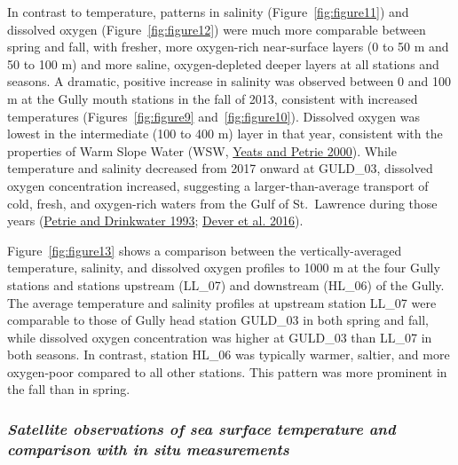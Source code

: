 \documentclass[12pt]{article}\usepackage[]{graphicx}\usepackage[]{color}
\begin{document}
In contrast to temperature, patterns in salinity (Figure~\ref{fig:figure11}) and dissolved oxygen (Figure~\ref{fig:figure12}) were much more comparable between spring and fall, with fresher, more oxygen-rich near-surface layers (0 to 50 m and 50 to 100 m) and more saline, oxygen-depleted deeper layers at all stations and seasons. A dramatic, positive increase in salinity was observed between 0 and 100 m at the Gully mouth stations in the fall of 2013, consistent with increased temperatures (Figures~\ref{fig:figure9} and~\ref{fig:figure10}). Dissolved oxygen was lowest in the intermediate (100 to 400 m) layer in that year, consistent with the properties of Warm Slope Water (WSW, \protect\hyperlink{ref-yeats_2000}{Yeats and Petrie 2000}). While temperature and salinity decreased from 2017 onward at GULD\_03, dissolved oxygen concentration increased, suggesting a larger-than-average transport of cold, fresh, and oxygen-rich waters from the Gulf of St.~Lawrence during those years (\protect\hyperlink{ref-petrie_1993}{Petrie and Drinkwater 1993}; \protect\hyperlink{ref-dever_2016}{Dever et al. 2016}).

Figure~\ref{fig:figure13} shows a comparison between the vertically-averaged temperature, salinity, and dissolved oxygen profiles to 1000 m at the four Gully stations and stations upstream (LL\_07) and downstream (HL\_06) of the Gully. The average temperature and salinity profiles at upstream station LL\_07 were comparable to those of Gully head station GULD\_03 in both spring and fall, while dissolved oxygen concentration was higher at GULD\_03 than LL\_07 in both seasons. In contrast, station HL\_06 was typically warmer, saltier, and more oxygen-poor compared to all other stations. This pattern was more prominent in the fall than in spring.

\hypertarget{satellite-observations-of-sea-surface-temperature-and-comparison-with-in-situ-measurements}{%
\subsubsection{\texorpdfstring{\emph{Satellite observations of sea surface temperature and comparison with in situ measurements}}{Satellite observations of sea surface temperature and comparison with in situ measurements}}\label{satellite-observations-of-sea-surface-temperature-and-comparison-with-in-situ-measurements}}
\end{document}
